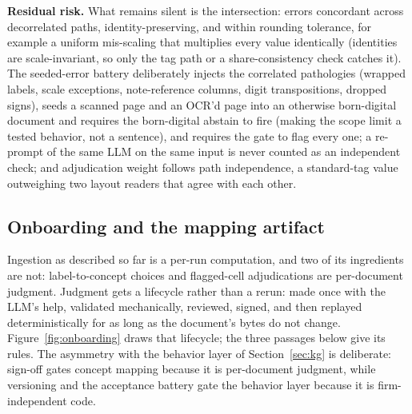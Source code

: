 \documentclass[11pt]{article}
\newcommand{\lead}[2]{\par\addvspace{5pt}\textbf{\textcolor{#1}{#2}}}
\begin{document}
\lead{navytwo}{Residual risk.} What remains silent is the intersection: errors concordant across decorrelated paths, identity-preserving, and within rounding tolerance, for example a uniform mis-scaling that multiplies every value identically (identities are scale-invariant, so only the tag path or a share-consistency check catches it). The seeded-error battery deliberately injects the correlated pathologies (wrapped labels, scale exceptions, note-reference columns, digit transpositions, dropped signs), seeds a scanned page and an OCR'd page into an otherwise born-digital document and requires the born-digital abstain to fire (making the scope limit a tested behavior, not a sentence), and requires the gate to flag every one; a re-prompt of the same LLM on the same input is never counted as an independent check; and adjudication weight follows path independence, a standard-tag value outweighing two layout readers that agree with each other.

\subsection{Onboarding and the mapping artifact}
\label{sec:onboarding}
Ingestion as described so far is a per-run computation, and two of its ingredients are not: label-to-concept choices and flagged-cell adjudications are per-document judgment. Judgment gets a lifecycle rather than a rerun: made once with the LLM's help, validated mechanically, reviewed, signed, and then replayed deterministically for as long as the document's bytes do not change. Figure~\ref{fig:onboarding} draws that lifecycle; the three passages below give its rules. The asymmetry with the behavior layer of Section~\ref{sec:kg} is deliberate: sign-off gates concept mapping because it is per-document judgment, while versioning and the acceptance battery gate the behavior layer because it is firm-independent code.
\end{document}
